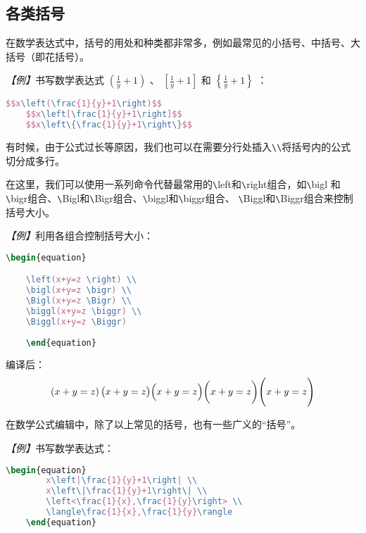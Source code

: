 \subsection{各类括号}
在数学表达式中，括号的用处和种类都非常多，例如最常见的小括号、中括号、大括号（即花括号）。

\emph{【例】}书写数学表达式 $\left(\frac{1}{y}+1\right)$ 、 $\left[\frac{1}{y}+1\right]$ 和 $\left\{\frac{1}{y}+1\right\}$ ：
\begin{lstlisting}[language=TeX]
    $$x\left(\frac{1}{y}+1\right)$$
    $$x\left[\frac{1}{y}+1\right]$$
    $$x\left\{\frac{1}{y}+1\right\}$$
\end{lstlisting}

有时候，由于公式过长等原因，我们也可以在需要分行处插入\verb|\\|将括号内的公式切分成多行。

在这里，我们可以使用一系列命令代替最常用的\verb|\|left和\verb|\|right组合，如\verb|\|bigl
和\verb|\|bigr组合、\verb|\|Bigl和\verb|\|Bigr组合、\verb|\|biggl和\verb|\|biggr组合、
\verb|\|Biggl和\verb|\|Biggr组合来控制括号大小。

\emph{【例】}利用各组合控制括号大小：
\begin{lstlisting}[language=TeX]
    \begin{equation}

    \left(x+y=z \right) \\
    \bigl(x+y=z \bigr) \\
    \Bigl(x+y=z \Bigr) \\
    \biggl(x+y=z \biggr) \\
    \Biggl(x+y=z \Biggr)
    
    \end{equation}        
\end{lstlisting}

编译后：
\begin{equation}
    \left(x+y=z \right) \\
    \bigl(x+y=z \bigr) \\
    \Bigl(x+y=z \Bigr) \\
    \biggl(x+y=z \biggr) \\
    \Biggl(x+y=z \Biggr)
\end{equation}

在数学公式编辑中，除了以上常见的括号，也有一些广义的“括号”。

\emph{【例】}书写数学表达式：
\begin{lstlisting}[language=TeX]
    \begin{equation}
        x\left|\frac{1}{y}+1\right| \\
        x\left\|\frac{1}{y}+1\right\| \\
        \left<\frac{1}{x},\frac{1}{y}\right> \\
        \langle\frac{1}{x},\frac{1}{y}\rangle
    \end{equation}   
\end{lstlisting}

